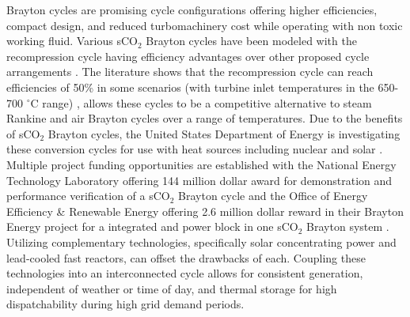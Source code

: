  Brayton cycles are promising cycle configurations offering higher efficiencies, compact design, and reduced turbomachinery cost while operating with non toxic working fluid. Various sCO$_2$ Brayton cycles have been modeled with the recompression cycle having efficiency advantages over other proposed cycle arrangements \cite{turchi_2013,ahn_2014,wang_2018}. The literature shows that the recompression cycle can reach efficiencies of 50\% in some scenarios (with turbine inlet temperatures in the 650-700 $^{\circ}$C range) \cite{turchi_2013,wright_2009}, allows these cycles to be a competitive alternative to steam Rankine and air Brayton cycles over a range of temperatures. Due to the benefits of sCO$_2$ Brayton cycles, the United States Department of Energy is investigating these conversion cycles for use with heat sources including nuclear and solar \cite{doe_2012}. Multiple project funding opportunities are established with the National Energy Technology Laboratory offering 144 million dollar award for demonstration and performance verification of a sCO$_2$ Brayton cycle \cite{netl_2016} and the Office of Energy Efficiency \& Renewable Energy offering 2.6 million dollar reward in their Brayton Energy project for a integrated  and power block in one sCO$_2$ Brayton system \cite{seto_2015}. Utilizing complementary technologies, specifically solar concentrating power and lead-cooled fast reactors, can offset the drawbacks of each.  Coupling these technologies into an interconnected cycle allows for consistent generation, independent of weather or time of day, and thermal storage for high dispatchability during high grid demand periods. 
